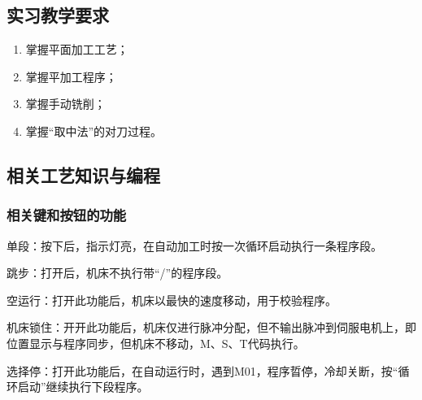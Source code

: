\jxhj{%
	}

\makeshouye %

\subsection{实习教学要求}
\begin{enumerate}[1、]
\item 掌握平面加工工艺；
\item 掌握平加工程序；
\item 掌握手动铣削；
\item 掌握“取中法”的对刀过程。
\end{enumerate}


\subsection{相关工艺知识与编程}

\subsubsection{相关键和按钮的功能}
单段：按下后，指示灯亮，在自动加工时按一次循环启动执行一条程序段。

跳步：打开后，机床不执行带“/”的程序段。

空运行：打开此功能后，机床以最快的速度移动，用于校验程序。

机床锁住：开开此功能后，机床仅进行脉冲分配，但不输出脉冲到伺服电机上，即位置显示与程序同步，但机床不移动，M、S、T代码执行。

选择停：打开此功能后，在自动运行时，遇到M01，程序晢停，冷却关断，按“循环启动”继续执行下段程序。

